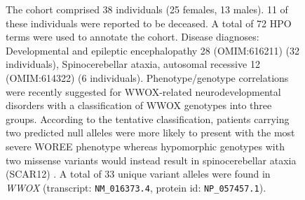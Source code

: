 \begin{figure}[htbp]
\vspace{2em}

\caption{ The cohort comprised 38 individuals (25 females, 13 males). 11 of these individuals were reported to be deceased.
A total of 72 HPO terms were used to annotate the cohort. Disease diagnoses: Developmental and epileptic encephalopathy 28 (OMIM:616211) (32 individuals), Spinocerebellar ataxia, autosomal recessive 12 (OMIM:614322) (6 individuals).
Phenotype/genotype correlations were recently suggested for WWOX-related neurodevelopmental disorders 
with a classification of WWOX genotypes into three groups. According to the tentative classification, patients carrying two predicted null alleles were more likely to present with the most severe WOREE phenotype whereas hypomorphic genotypes 
with two missense variants would instead result in spinocerebellar ataxia (SCAR12) \cite{PMID_30356099,PMID_25716914,PMID_25411445}. A total of 33 unique variant alleles were found in \textit{WWOX} (transcript: \texttt{NM\_016373.4}, protein id: \texttt{NP\_057457.1}).}
\end{figure}
